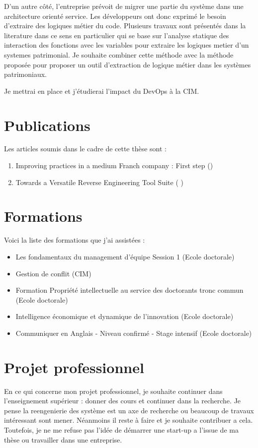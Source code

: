 \documentclass[a4paper]{article}
\begin{document}
D'un autre côté, l'entreprise prévoit de migrer une partie du système dans une architecture orienté service. 
Les développeurs ont donc exprimé le besoin d'extraire des logiques métier du code.
Plusieurs travaux sont présentés dans la literature dans ce sens en particulier \cite{Lei05a} qui se base sur l'analyse statique des interaction des fonctions avec les variables pour extraire les logiques metier d'un systemes patrimonial. 
Je souhaite combiner cette méthode avec la méthode proposée \cite{anqu19a} pour proposer un outil d'extraction de logique métier dans les systèmes patrimoniaux.

Je mettrai en place et j'étudierai l'impact du DevOps à la CIM. 

\section{Publications}

Les articles soumis dans le cadre de cette thèse sont :
\begin{enumerate}
\item Improving practices in a medium Franch company : First step (\citet{Houe20a})
\item Towards a Versatile Reverse Engineering Tool Suite ( \citet{Houe20b})

\end{enumerate}

\section{Formations}
Voici la liste des formations que j'ai assistées :
\begin{itemize}
\item Les fondamentaux du management d’équipe Session 1 (Ecole doctorale)
\item Gestion de conflit (CIM) 
\item Formation Propriété intellectuelle au service des doctorants tronc commun (Ecole doctorale)
\item Intelligence économique et dynamique de l'innovation (Ecole doctorale)
\item Communiquer en Anglais - Niveau confirmé - Stage intensif (Ecole doctorale)
\end{itemize}

\section{Projet professionnel}
En ce qui concerne mon projet professionnel, je souhaite continuer dans l'enseignement supérieur : donner des cours et continuer dans la recherche.
Je pense la reengenierie des système est un axe de recherche ou beaucoup de travaux intéressant sont mener. Néanmoins il reste à faire et je souhaite contribuer a cela.
Toutefois, je ne me refuse pas l'idée de démarrer une start-up a l'issue de ma thèse ou travailler dans une entreprise.

\footnotesize{
 

}
\end{document}
